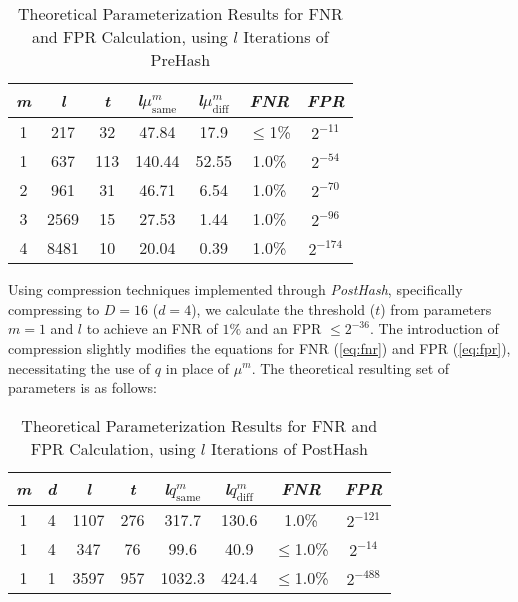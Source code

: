 \begin{table}[htbp] 
    \centering
    \begin{tabular}{|c|c|c|c|c|c|c|}
        \hline
        \textit{m} & \textit{l} & \textit{t} & \textit{l}\(\mu_{\text{same}}^m\) & \textit{l}\(\mu_{\text{diff}}^m\) & \textit{FNR} & \textit{FPR} \\
        \hline
        1 & 217 & 32 & 47.84 & 17.9 & \(\leq\)1\% & \(2^{-11}\)\\
        1 & 637 & 113 & 140.44 & 52.55 & 1.0\% & \(2^{-54}\) \\
        2 & 961 & 31 & 46.71 & 6.54 & 1.0\% & \(2^{-70}\) \\
        3 & 2569 & 15 & 27.53 & 1.44 & 1.0\% &\(2^{-96}\) \\
        4 & 8481 & 10 & 20.04 & 0.39 & 1.0\% & \(2^{-174}\) \\
        \hline
    \end{tabular}
    \caption{Theoretical Parameterization Results for FNR and FPR Calculation, using $l$ Iterations of PreHash}
    \label{tab:theoretical_parameterization_PreHash}
\end{table}

Using compression techniques implemented through \textit{PostHash}, specifically compressing to \( D = 16 \) (\( d = 4 \)), we calculate the threshold (\( t \)) from parameters \( m = 1 \) and \( l \) to achieve an FNR of \(1\%\) and an FPR \(\leq 2^{-36} \). The introduction of compression slightly modifies the equations for FNR (\ref{eq:fnr}) and FPR (\ref{eq:fpr}), necessitating the use of \( q \) in place of \(\mu^m\). The theoretical resulting set of parameters is as follows:

\begin{table}[htbp] 
    \centering
    \begin{tabular}{|c|c|c|c|c|c|c|c|}
        \hline
        \textit{m} & \textit{d} & \textit{l} & \textit{t} & \textit{l}\(q_{\text{same}}^m\) & \textit{l}\(q_{\text{diff}}^m\) & \textit{FNR} & \textit{FPR} \\
        \hline
        1 & 4 & 1107 & 276 & 317.7 & 130.6 & 1.0\% & \(2^{-121}\) \\
        1 & 4 & 347 & 76 & 99.6 & 40.9 & \(\leq\)1.0\% & \(2^{-14}\)\\
        1 & 1 & 3597 & 957 & 1032.3 & 424.4 & \(\leq\)1.0\% & \(2^{-488}\)\\
        \hline
    \end{tabular}
    \caption{Theoretical Parameterization Results for FNR and FPR Calculation, using $l$ Iterations of PostHash}
    \label{tab:theoretical_parameterization_PostHash}
\end{table}


